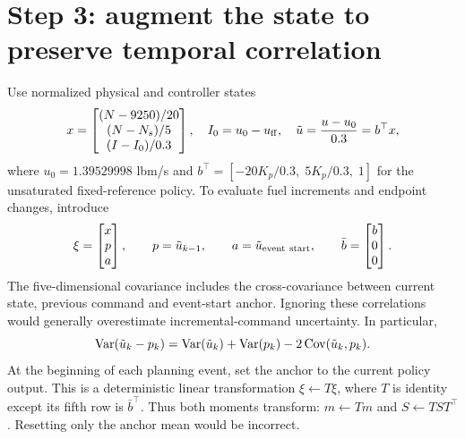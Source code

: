\section{Step 3: augment the state to preserve temporal correlation}
Use normalized physical and controller states
\begin{equation}
x=\begin{bmatrix}(N-9250)/20\\(N-N_s)/5\\(I-I_0)/0.3\end{bmatrix},\quad
I_0=u_0-u_{\rm ff},\quad\tilde u=\frac{u-u_0}{0.3}=b^\top x,
\end{equation}
where $u_0=1.39529998$ lbm/s and $b^\top=[-20K_p/0.3,\;5K_p/0.3,\;1]$ for the unsaturated fixed-reference policy. To evaluate fuel increments and endpoint changes, introduce
\begin{equation}
\xi=\begin{bmatrix}x\\p\\a\end{bmatrix},\qquad p=\tilde u_{k-1},\qquad a=\tilde u_{\rm event\ start},\qquad
\bar b=\begin{bmatrix}b\\0\\0\end{bmatrix}.
\end{equation}
The five-dimensional covariance includes the cross-covariance between current state, previous command and event-start anchor. Ignoring these correlations would generally overestimate incremental-command uncertainty. In particular,
\begin{equation}
\operatorname{Var}(\tilde u_k-p_k)=\operatorname{Var}(\tilde u_k)+\operatorname{Var}(p_k)-2\operatorname{Cov}(\tilde u_k,p_k).
\end{equation}
At the beginning of each planning event, set the anchor to the current policy output. This is a deterministic linear transformation $\xi\leftarrow T\xi$, where $T$ is identity except its fifth row is $\bar b^\top$. Thus both moments transform: $m\leftarrow Tm$ and $S\leftarrow TST^\top$. Resetting only the anchor mean would be incorrect.

